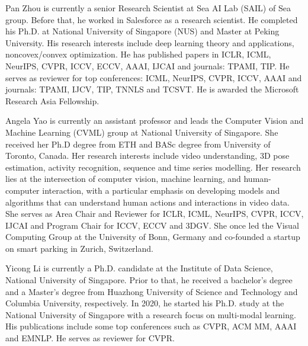 \documentclass[10pt,journal,compsoc]{IEEEtran}
\begin{document}
\begin{IEEEbiography}{Pan Zhou} is currently a senior Research Scientist at Sea AI Lab (SAIL) of Sea group. Before that, he worked in Salesforce as a research scientist. He completed his Ph.D. at National University of Singapore (NUS) and Master at Peking University. His research interests include deep learning theory and applications, noncovex/convex optimization. He has published papers in ICLR, ICML, NeurIPS, CVPR, ICCV, ECCV, AAAI, IJCAI and journals: TPAMI, TIP. He serves as reviewer for top conferences: ICML, NeurIPS, CVPR, ICCV, AAAI and journals: TPAMI, IJCV, TIP, TNNLS and TCSVT. He is awarded the Microsoft Research Asia Fellowship.
\end{IEEEbiography}

\begin{IEEEbiography}{Angela Yao} is currently an assistant professor and leads the Computer Vision and Machine Learning (CVML) group at National University of Singapore. She received her Ph.D degree from ETH and BASc degree from University of Toronto, Canada. Her research interests include video understanding, 3D pose estimation, activity recognition, sequence and time series modelling. Her research lies at the intersection of computer vision, machine learning, and human-computer interaction, with a particular emphasis on developing models and algorithms that can understand human actions and interactions in video data. She serves as Area Chair and Reviewer for ICLR, ICML, NeurIPS, CVPR, ICCV, IJCAI and Program Chair for ICCV, ECCV and 3DGV. She once led the Visual Computing Group at the University of Bonn, Germany and co-founded a startup on smart parking in Zurich, Switzerland.
\end{IEEEbiography}

\begin{IEEEbiography}{Yicong Li} is currently a Ph.D. candidate at the Institute of Data Science, National University of Singapore. Prior to that, he received a bachelor's degree and a Master's degree from Huazhong University of Science and Technology and Columbia University, respectively. In 2020, he started his Ph.D. study at the National University of Singapore with a research focus on multi-modal learning. His publications include some top conferences such as CVPR, ACM MM, AAAI and EMNLP. He serves as reviewer for CVPR.
\end{IEEEbiography}
\end{document}
